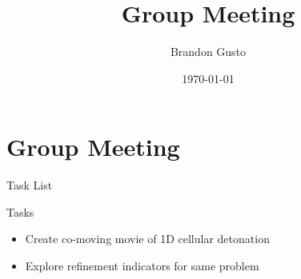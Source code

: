 \documentclass{beamer}
\begin{document}
  \section{Group Meeting}
  \title{Group Meeting}
  \author{Brandon Gusto}

  \date{\today}
  \frame{\titlepage}

  \begin{frame}{Task List}
    \begin{block}{Tasks}
      \begin{itemize}
        \setlength\itemsep{1em}
        \item Create co-moving movie of 1D cellular detonation
        \item Explore refinement indicators for same problem
      \end{itemize}
    \end{block}
  \end{frame}
\end{document}
